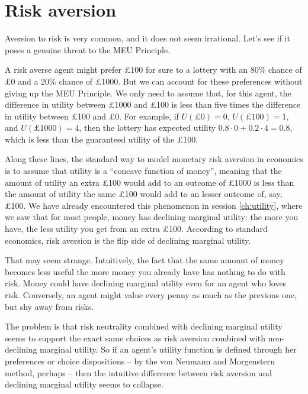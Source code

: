 \section{Risk aversion}

Aversion to risk is very common, and it does not seem
irrational. Let's see if it poses a genuine threat to the MEU
Principle.

A risk averse agent might prefer £100 for sure to a lottery with an
80\% chance of £0 and a 20\% chance of £1000. But we can account for
these preferences without giving up the MEU Principle. We only need to
assume that, for this agent, the difference in utility between £1000
and £100 is less than five times the difference in utility between
£100 and £0. For example, if $U(\text{£0}) = 0$, $U(\text{£100}) = 1$,
and $U(\text{£1000}) = 4$, then the lottery has expected utility $0.8
\cdot 0 + 0.2 \cdot 4 = 0.8$, which is less than the guaranteed
utility of the £100.


Along these lines, the standard way to model monetary risk aversion in
economics is to assume that utility is a ``concave function of
money'', meaning that the amount of utility an extra £100 would add to
an outcome of £1000 is less than the amount of utility the same £100
would add to an lesser outcome of, say, £100. We have already
encountered this phenomenon in session \ref{ch:utility}, where we saw
that for most people, money has declining marginal utility: the more
you have, the less utility you get from an extra £100. According to
standard economics, risk aversion is the flip side of declining
marginal utility.

That may seem strange. Intuitively, the fact that the same amount of
money becomes less useful the more money you already have has nothing
to do with risk. Money could have declining marginal utility even for
an agent who loves risk. Conversely, an agent might value every penny
as much as the previous one, but shy away from risks.

The problem is that risk neutrality combined with declining marginal
utility seems to support the exact same choices as risk aversion
combined with non-declining marginal utility. So if an agent's utility
function is defined through her preferences or choice dispositions --
by the von Neumann and Morgenstern method, perhaps -- then the
intuitive difference between risk aversion and declining marginal
utility seems to collapse.

